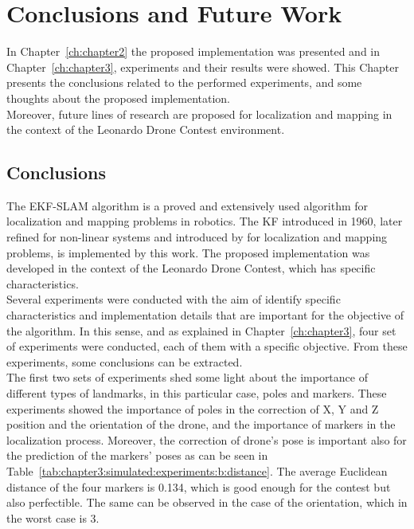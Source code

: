 \chapter{Conclusions and Future Work}
\label{ch:chapter4}
In Chapter~\ref{ch:chapter2} the proposed implementation was presented and in Chapter~\ref{ch:chapter3}, experiments and their results were showed. This Chapter presents the conclusions related to the performed experiments, and some thoughts about the proposed implementation.\\

Moreover, future lines of research are proposed for localization and mapping in the context of the Leonardo Drone Contest environment.

\section{Conclusions}
The EKF-SLAM algorithm is a proved and extensively used algorithm for localization and mapping problems in robotics. The \ac{KF} introduced in 1960, later refined for non-linear systems and introduced by \cite{ekf-slam-smith} for localization and mapping problems, is implemented by this work. The proposed implementation was developed in the context of the Leonardo Drone Contest, which has specific characteristics.\\

Several experiments were conducted with the aim of identify specific characteristics and implementation details that are important for the objective of the algorithm. In this sense, and as explained in Chapter~\ref{ch:chapter3}, four set of experiments were conducted, each of them with a specific objective. From these experiments, some conclusions can be extracted.\\

The first two sets of experiments shed some light about the importance of different types of landmarks, in this particular case, poles and markers. These experiments showed the importance of poles in the correction of X, Y and Z position and the orientation of the drone, and the importance of markers in the localization process. Moreover, the correction of drone's pose is important also for the prediction of the markers' poses as can be seen in Table~\ref{tab:chapter3:simulated:experiments:b:distance}. The average Euclidean distance of the four markers is 0.134, which is good enough for the contest but also perfectible. The same can be observed in the case of the orientation, which in the worst case is 3\textdegree.\\

